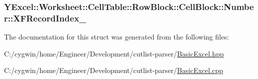 \subsubsection[{X\+F\+Record\+Index\+\_\+}]{ Y\+Excel\+::\+Worksheet\+::\+Cell\+Table\+::\+Row\+Block\+::\+Cell\+Block\+::\+Number\+::\+X\+F\+Record\+Index\+\_\+}\label{struct_y_excel_1_1_worksheet_1_1_cell_table_1_1_row_block_1_1_cell_block_1_1_number_a1992bc8ab123143b03701c3202d108fc}


The documentation for this struct was generated from the following files\+:\begin{DoxyCompactItemize}
\item 
C\+:/cygwin/home/\+Engineer/\+Development/cutlist-\/parser/\hyperlink{_basic_excel_8hpp}{Basic\+Excel.\+hpp}\item 
C\+:/cygwin/home/\+Engineer/\+Development/cutlist-\/parser/\hyperlink{_basic_excel_8cpp}{Basic\+Excel.\+cpp}\end{DoxyCompactItemize}
